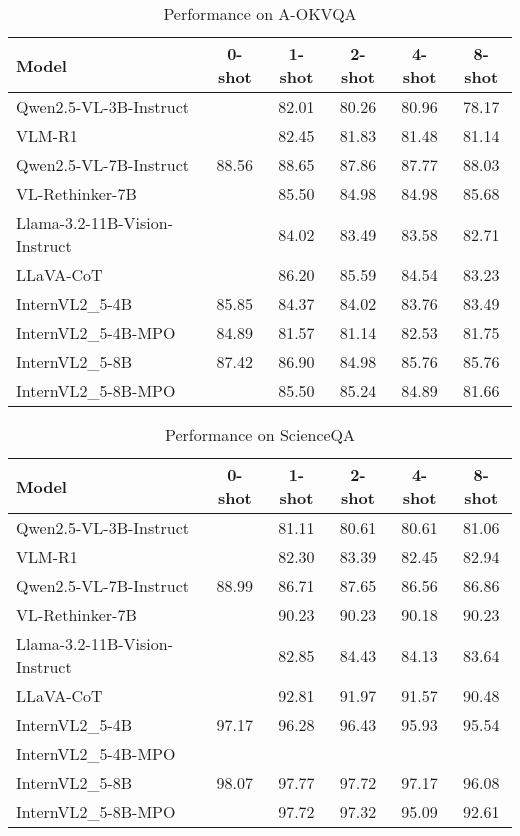 \begin{table*}[t]\centering
\small
\begin{table}
\caption{Performance on A-OKVQA}
\label{tab:a-okvqa_results}
\begin{tabular}{p{4.5cm}ccccc}
\toprule
Model & 0-shot & 1-shot & 2-shot & 4-shot & 8-shot \\
\midrule
Qwen2.5-VL-3B-Instruct &  & 82.01 & 80.26 & 80.96 & 78.17 \\
VLM-R1 &  & 82.45 & 81.83 & 81.48 & 81.14 \\
Qwen2.5-VL-7B-Instruct & 88.56 & 88.65 & 87.86 & 87.77 & 88.03 \\
VL-Rethinker-7B &  & 85.50 & 84.98 & 84.98 & 85.68 \\
Llama-3.2-11B-Vision-Instruct &  & 84.02 & 83.49 & 83.58 & 82.71 \\
LLaVA-CoT &  & 86.20 & 85.59 & 84.54 & 83.23 \\
InternVL2_5-4B & 85.85 & 84.37 & 84.02 & 83.76 & 83.49 \\
InternVL2_5-4B-MPO & 84.89 & 81.57 & 81.14 & 82.53 & 81.75 \\
InternVL2_5-8B & 87.42 & 86.90 & 84.98 & 85.76 & 85.76 \\
InternVL2_5-8B-MPO &  & 85.50 & 85.24 & 84.89 & 81.66 \\
\bottomrule
\end{tabular}
\end{table}

\end{table*}

\begin{table*}[t]\centering
\small
\begin{table}
\caption{Performance on ScienceQA}
\label{tab:scienceqa_results}
\begin{tabular}{p{4.5cm}ccccc}
\toprule
Model & 0-shot & 1-shot & 2-shot & 4-shot & 8-shot \\
\midrule
Qwen2.5-VL-3B-Instruct &  & 81.11 & 80.61 & 80.61 & 81.06 \\
VLM-R1 &  & 82.30 & 83.39 & 82.45 & 82.94 \\
Qwen2.5-VL-7B-Instruct & 88.99 & 86.71 & 87.65 & 86.56 & 86.86 \\
VL-Rethinker-7B &  & 90.23 & 90.23 & 90.18 & 90.23 \\
Llama-3.2-11B-Vision-Instruct &  & 82.85 & 84.43 & 84.13 & 83.64 \\
LLaVA-CoT &  & 92.81 & 91.97 & 91.57 & 90.48 \\
InternVL2_5-4B & 97.17 & 96.28 & 96.43 & 95.93 & 95.54 \\
InternVL2_5-4B-MPO &  &  &  &  &  \\
InternVL2_5-8B & 98.07 & 97.77 & 97.72 & 97.17 & 96.08 \\
InternVL2_5-8B-MPO &  & 97.72 & 97.32 & 95.09 & 92.61 \\
\bottomrule
\end{tabular}
\end{table}

\end{table*}

